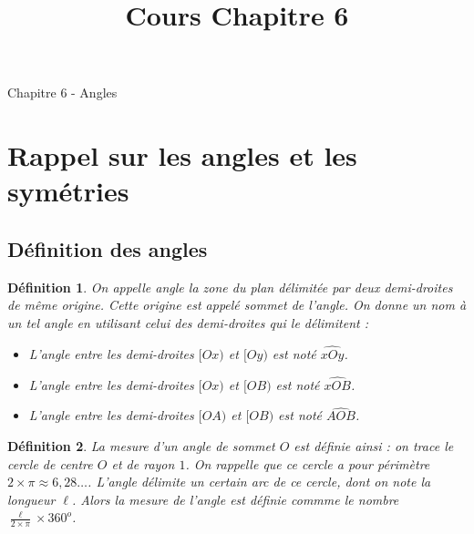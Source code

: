 \documentclass[12 pt]{article}
\title{Cours Chapitre 6}
\date{}
\theoremstyle{plain}
\newcounter{n}
\numberwithin{n}{section}
\newtheorem*{df}{Définition}
\begin{document}
\begin{center}{\Large Chapitre 6 - Angles}\\ 
 \end{center}
\section{Rappel sur les angles et les symétries}
\subsection{Définition des angles}
\begin{df}
On appelle \emph{angle} la zone du plan délimitée par deux demi-droites de même origine. 
Cette origine est appelé \emph{sommet} de l'angle. 
On donne un nom à un tel angle en utilisant celui des demi-droites qui le délimitent : \begin{itemize}
\item L'angle entre les demi-droites $[Ox)$ et $[Oy)$ est noté $\widehat{xOy}$.
\item L'angle entre les demi-droites $[Ox)$ et $[OB)$ est noté $\widehat{xOB}$.
\item L'angle entre les demi-droites $[OA)$ et $[OB)$ est noté $\widehat{AOB}$.
\end{itemize}
\end{df}

\begin{df}
La \emph{mesure} d'un angle de sommet $O$ est définie ainsi : on trace le cercle de centre $O$ 
et de rayon $1$. On rappelle que ce cercle a pour périmètre $2\times \pi\approx 6,28\ldots$. L'angle 
délimite un certain arc de ce cercle, dont on note la longueur $\ell$. Alors la mesure de l'angle est 
définie commme le nombre $\frac{\ell}{2\times \pi} \times 360^o$.
\end{df}
\end{document}
